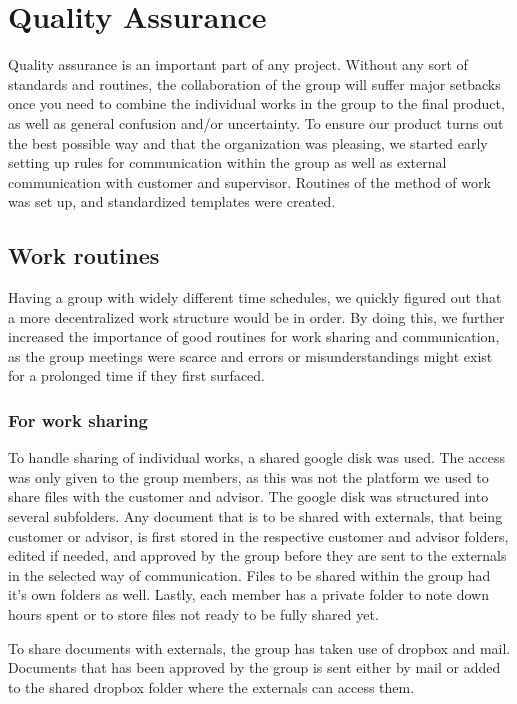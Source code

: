 \documentclass[11pt]{book}
\begin{document}
\section{Quality Assurance}
Quality assurance is an important part of any project. Without any sort of standards and routines, the collaboration of the group will suffer major setbacks once you need to combine the individual works in the group to the final product, as well as general confusion and/or uncertainty. To ensure our product turns out the best possible way and that the organization was pleasing, we started early setting up rules for communication within the group as well as external communication with customer and supervisor. Routines of the method of work was set up, and standardized templates were created.

\subsection{Work routines}
Having a group with widely different time schedules, we quickly figured out that a more decentralized work structure would be in order. By doing this, we further increased the importance of good routines for work sharing and communication, as the group meetings were scarce and errors or misunderstandings might exist for a prolonged time if they first surfaced.

\subsubsection{For work sharing}
To handle sharing of individual works, a shared google disk was used. The access was only given to the group members, as this was not the platform we used to share files with the customer and advisor. The google disk was structured into several subfolders. Any document that is to be shared with externals, that being customer or advisor, is first stored in the respective customer and advisor folders, edited if needed, and approved by the group before they are sent to the externals in the selected way of communication. Files to be shared within the group had it's own folders as well. Lastly, each member has a private folder to note down hours spent or to store files not ready to be fully shared yet.

To share documents with externals, the group has taken use of dropbox and mail. Documents that has been approved by the group is sent either by mail or added to the shared dropbox folder where the externals can access them.
\end{document}

